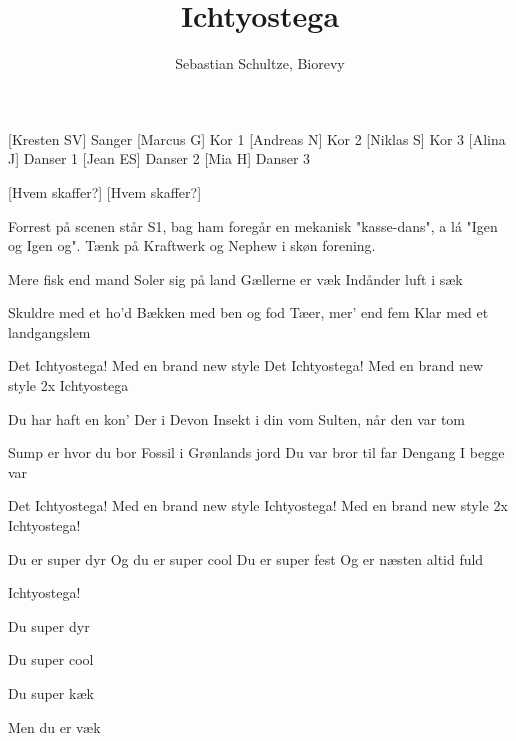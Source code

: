 \documentclass[a4paper,12pt]{article}
\title{Ichtyostega}
\author{Sebastian Schultze, Biorevy}
\begin{document}
\maketitle

\begin{texxers}
\end{texxers}

\begin{roles}
	[Kresten SV] Sanger
	[Marcus G] Kor 1
	[Andreas N] Kor 2	
	[Niklas S] Kor 3	
	[Alina J] Danser 1
	[Jean ES] Danser 2
	[Mia H] Danser 3
\end{roles}


\begin{props}
	[Hvem skaffer?] 
	[Hvem skaffer?]
\end{props}

\scene Forrest på scenen står S1, bag ham foregår en mekanisk "kasse-dans", a lá "Igen og Igen og". Tænk på Kraftwerk og Nephew i skøn forening.

\begin{song}


Mere fisk end mand
Soler sig på land
Gællerne er væk
Indånder luft i sæk
 
Skuldre med et ho'd	
Bækken med ben og fod
Tæer, mer' end fem
Klar med et landgangslem

Det Ichtyostega!
Med en brand new style
Det Ichtyostega!
Med en brand new style
2x Ichtyostega

Du har haft en kon'
Der i Devon
Insekt i din vom
Sulten, når den var tom

Sump er hvor du bor	
Fossil i Grønlands jord
Du var bror til far
Dengang I begge var

Det Ichtyostega!
Med en brand new style
Ichtyostega!
Med en brand new style
2x Ichtyostega!

Du er super dyr
Og du er super cool
Du er super fest
Og er næsten altid fuld

Ichtyostega!

Du super dyr
				
Du super cool

Du super kæk

Men du er væk



\end{song}
\end{document}
